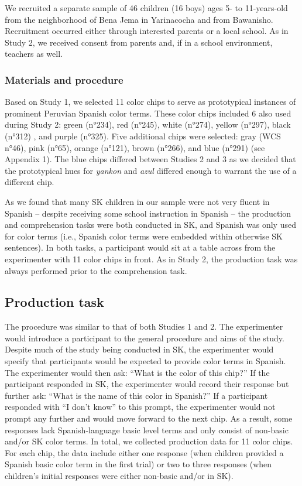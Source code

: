 \documentclass[
  english,
  ,apa7,floatsintext]{apa6}
\begin{document}
We recruited a separate sample of 46 children (16 boys) ages 5- to 11-years-old from the neighborhood of Bena Jema in Yarinacocha and from Bawanisho. Recruitment occurred either through interested parents or a local school. As in Study 2, we received consent from parents and, if in a school environment, teachers as well.

\hypertarget{materials-and-procedure-2}{%
\subsubsection{Materials and procedure}\label{materials-and-procedure-2}}

Based on Study 1, we selected 11 color chips to serve as prototypical instances of prominent Peruvian Spanish color terms. These color chips included 6 also used during Study 2: green (n°234), red (n°245), white (n°274), yellow (n°297), black (n°312) , and purple (n°325). Five additional chips were selected: gray (WCS n°46), pink (n°65), orange (n°121), brown (n°266), and blue (n°291) (see Appendix 1). The blue chips differed between Studies 2 and 3 as we decided that the prototypical hues for \emph{yankon} and \emph{azul} differed enough to warrant the use of a different chip.

As we found that many SK children in our sample were not very fluent in Spanish -- despite receiving some school instruction in Spanish -- the production and comprehension tasks were both conducted in SK, and Spanish was only used for color terms (i.e., Spanish color terms were embedded within otherwise SK sentences). In both tasks, a participant would sit at a table across from the experimenter with 11 color chips in front. As in Study 2, the production task was always performed prior to the comprehension task.

\hypertarget{production-task-1}{%
\subsection{Production task}\label{production-task-1}}

The procedure was similar to that of both Studies 1 and 2. The experimenter would introduce a participant to the general procedure and aims of the study. Despite much of the study being conducted in SK, the experimenter would specify that participants would be expected to provide color terms in Spanish. The experimenter would then ask: ``What is the color of this chip?'' If the participant responded in SK, the experimenter would record their response but further ask: ``What is the name of this color in Spanish?'' If a participant responded with ``I don't know'' to this prompt, the experimenter would not prompt any further and would move forward to the next chip. As a result, some responses lack Spanish-language basic level terms and only consist of non-basic and/or SK color terms. In total, we collected production data for 11 color chips. For each chip, the data include either one response (when children provided a Spanish basic color term in the first trial) or two to three responses (when children's initial responses were either non-basic and/or in SK).
\end{document}
